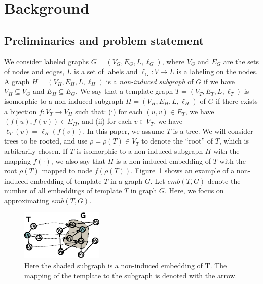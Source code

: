 \section{Background}
\label{sec:background}

\subsection{Preliminaries and problem statement}
\label{sec:intro-problem}

We consider labeled graphs $G=(V_G,E_G,L,\ell_G)$, where $V_G$ and $E_G$ are the sets of
nodes and edges, $L$ is a set of labels and $\ell_G: V \rightarrow L$ is a labeling
on the nodes.  A graph $H=(V_H, E_H, L, \ell_H)$ is a \emph{non-induced
subgraph} of $G$ if we have $V_H\subseteq V_G$ and $E_H\subseteq E_G$.  We
say that a template graph $T = (V_T, E_T, L, \ell_T)$ is isomorphic to a non-induced
subgraph $H = (V_H,E_H, L, \ell_H)$ of $G$ if there exists a bijection
$f: V_T \rightarrow V_H$ such that: (i) for each $(u, v) \in E_T$, we have
$(f(u), f(v))\in E_H$, and (ii) for each $v \in V_T$, we have
$\ell_T(v) = \ell_H(f(v))$. In this paper, we assume $T$ is a tree. We will consider trees to be rooted,
and use $\rho=\rho(T)\in V_T$ to denote the ``root'' of $T$, which is arbitrarily chosen.
If $T$ is isomorphic to a non-induced subgraph $H$ with the mapping $f(\cdot)$,
we also say that $H$ is a non-induced embedding of $T$ with the root $\rho(T)$
mapped to node $f(\rho(T))$.
Figure~\ref{fig:isomorphism} shows an example of a non-induced embedding of template
$T$ in a graph $G$.
Let $emb(T, G)$ denote the number of all embeddings of template $T$ in graph $G$.
Here, we focus on approximating $emb(T, G)$.

\begin{figure}[htbp]
\centerline{\includegraphics[width=0.35\textwidth]{plots/isomorphism.eps}}
\caption{Here the shaded subgraph is a non-induced embedding of T. The mapping
of the template to the subgraph is denoted with the arrow.}
\label{fig:isomorphism}
\end{figure}


